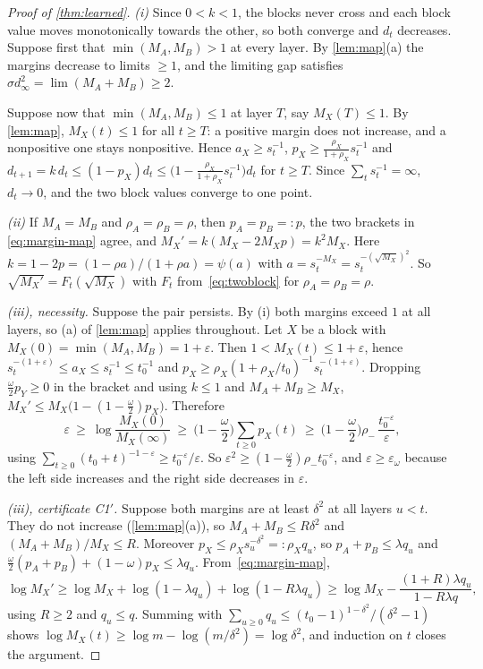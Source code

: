 \begin{proof}[Proof of \cref{thm:learned}]
\emph{(i)} Since $0<k<1$, the blocks never cross and each block value moves monotonically towards the other, so both converge and $d_t$
decreases. Suppose first that $\min(M_A,M_B)>1$ at every layer. By \cref{lem:map}(a) the margins decrease to limits $\ge1$, and the limiting gap
satisfies $\sigma d_\infty^2=\lim(M_A+M_B)\ge2$.

Suppose now that $\min(M_A,M_B)\le1$ at layer $T$, say $M_X(T)\le1$. By \cref{lem:map}, $M_X(t)\le1$ for all $t\ge T$: a positive margin does not
increase, and a nonpositive one stays nonpositive. Hence $a_X\ge s_t^{-1}$, $p_X\ge\frac{\rho_X}{1+\rho_X}s_t^{-1}$ and
$d_{t+1}=k\,d_t\le(1-p_X)d_t\le\big(1-\frac{\rho_X}{1+\rho_X}s_t^{-1}\big)d_t$ for $t\ge T$. Since $\sum_ts_t^{-1}=\infty$, $d_t\to0$, and the two block
values converge to one point.

\emph{(ii)} If $M_A=M_B$ and $\rho_A=\rho_B=\rho$, then $p_A=p_B=:p$, the two brackets in \eqref{eq:margin-map} agree, and
$M_X'=k(M_X-2M_Xp)=k^2M_X$. Here $k=1-2p=(1-\rho a)/(1+\rho a)=\psi(a)$ with $a=s_t^{-M_X}=s_t^{-(\sqrt{M_X})^2}$. So
$\sqrt{M_X'}=F_t(\sqrt{M_X})$ with $F_t$ from~\eqref{eq:twoblock} for $\rho_A=\rho_B=\rho$.

\emph{(iii), necessity.} Suppose the pair persists. By (i) both margins exceed $1$ at all layers, so (a) of \cref{lem:map} applies throughout. Let
$X$ be a block with $M_X(0)=\min(M_A,M_B)=1+\varepsilon$. Then $1<M_X(t)\le1+\varepsilon$, hence $s_t^{-(1+\varepsilon)}\le a_X\le s_t^{-1}\le t_0^{-1}$ and
$p_X\ge\rho_X(1+\rho_X/t_0)^{-1}s_t^{-(1+\varepsilon)}$. Dropping $\frac\omega2p_Y\ge0$ in the bracket and using $k\le1$ and $M_A+M_B\ge M_X$,
$M_X'\le M_X\big(1-(1-\frac\omega2)p_X\big)$. Therefore
\[
\varepsilon\ \ge\ \log\frac{M_X(0)}{M_X(\infty)}\ \ge\ \Big(1-\frac\omega2\Big)\sum_{t\ge0}p_X(t)\ \ge\ \Big(1-\frac\omega2\Big)\rho_-\,\frac{t_0^{-\varepsilon}}{\varepsilon},
\]
using $\sum_{t\ge0}(t_0+t)^{-1-\varepsilon}\ge t_0^{-\varepsilon}/\varepsilon$. So $\varepsilon^2\ge(1-\frac\omega2)\rho_-t_0^{-\varepsilon}$, and $\varepsilon\ge\varepsilon_\omega$
because the left side increases and the right side decreases in $\varepsilon$.

\emph{(iii), certificate C1$'$.} Suppose both margins are at least $\delta^2$ at all layers $u<t$. They do not increase (\cref{lem:map}(a)), so
$M_A+M_B\le R\delta^2$ and $(M_A+M_B)/M_X\le R$. Moreover $p_X\le\rho_Xs_u^{-\delta^2}=:\rho_Xq_u$, so $p_A+p_B\le\lambda q_u$ and
$\frac\omega2(p_A+p_B)+(1-\omega)p_X\le\lambda q_u$. From~\eqref{eq:margin-map},
\[
\log M_X'\ge\log M_X+\log(1-\lambda q_u)+\log(1-R\lambda q_u)\ge\log M_X-\frac{(1+R)\lambda q_u}{1-R\lambda q},
\]
using $R\ge2$ and $q_u\le q$. Summing with $\sum_{u\ge0}q_u\le(t_0-1)^{1-\delta^2}/(\delta^2-1)$ shows $\log M_X(t)\ge\log m-\log(m/\delta^2)=\log\delta^2$,
and induction on $t$ closes the argument.


\end{proof}
